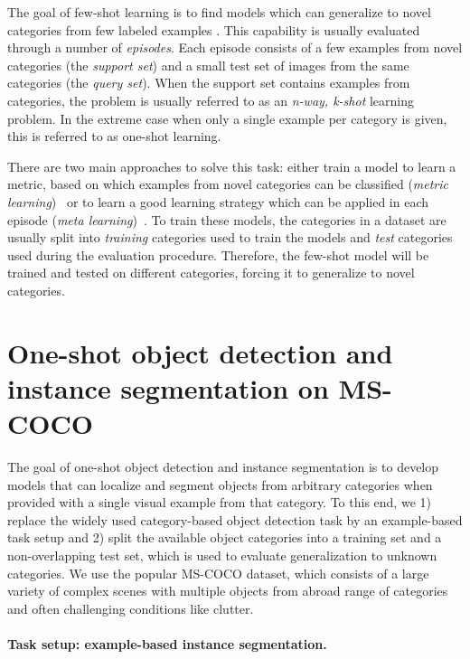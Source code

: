 \documentclass{article}
\newcommand{\coco}{MS-COCO\xspace}
\begin{document}
The goal of few-shot learning is to find models which can generalize to novel categories from few labeled examples \cite{FeiFei2006, Lake2015}. This capability is usually evaluated through a number of \emph{episodes}. Each episode consists of a few examples from novel categories (the \emph{support set}) and a small test set of images from the same categories (the \emph{query set}). When the support set contains  examples from  categories, the problem is usually referred to as an \emph{n-way, k-shot} learning problem. In the extreme case when only a single example per category is given, this is referred to as one-shot learning.

There are two main approaches to solve this task: either train a model to learn a metric, based on which examples from novel categories can be classified (\emph{metric learning})~\cite{Koch2015, Vinyals2016, Snell2017, Wang2018} or to learn a good learning strategy which can be applied in each episode (\emph{meta learning})~\cite{Finn2017, Li2017a, Munkhdalai2017, Munkhdalai2018, Sung2018, Ren2018, Sun2019, Rusu2018}. To train these models, the categories in a dataset are usually split into \emph{training} categories used to train the models and \emph{test} categories used during the evaluation procedure. Therefore, the few-shot model will be trained and tested on different categories, forcing it to generalize to novel categories.


\section{One-shot object detection and instance segmentation on \coco }
\label{sec:task}

The goal of one-shot object detection and instance segmentation is to develop models that can localize and segment objects from arbitrary categories when provided with a single visual example from that category. To this end, we 1) replace the widely used category-based object detection task by an example-based task setup and 2) split the available object categories into a training set and a non-overlapping test set, which is used to evaluate generalization to unknown categories. We use the popular \coco dataset, which consists of a large variety of complex scenes with multiple objects from abroad range of categories and often challenging conditions like clutter.

\paragraph{Task setup: example-based instance segmentation.}
\end{document}
